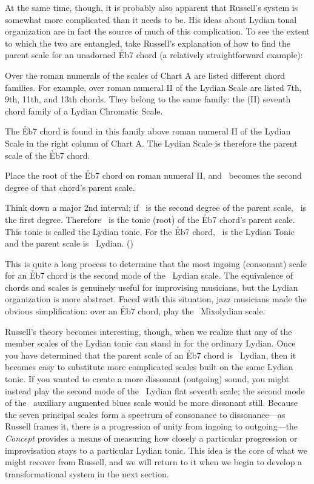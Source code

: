 At the same time, though, it is probably also apparent that Russell's system
is somewhat more complicated than it needs to be. His ideas about Lydian tonal
organization are in fact the source of much of this complication. To see the
extent to which the two are entangled, take Russell's explanation of
how to find the parent scale for an unadorned \h{Eb7} chord (a relatively
straightforward example):
%
\begin{quoting}
  \singlespacing
  Over the roman numerals of the scales of Chart A are listed different chord
  families. For example, over roman numeral II of the Lydian Scale are listed
  7th, 9th, 11th, and 13th chords. They belong to the same family: the (II)
  seventh chord family of a Lydian Chromatic Scale.

  The \h{Eb7} chord is found in this family above roman numeral II of the
  Lydian Scale in the right column of Chart A. The Lydian Scale is therefore
  the parent scale of the \h{Eb7} chord.

  Place the root of the \h{Eb7} chord on roman numeral II, and \Eflat\ becomes
  the second degree of that chord's parent scale.

  Think down a major 2nd interval; if \Eflat\ is the second degree of the
  parent scale, \Dflat\ is the first degree. Therefore \Dflat\ is the tonic
  (root) of the \h{Eb7} chord's parent scale. This tonic is called the Lydian
  tonic. For the \h{Eb7} chord, \Dflat\ is the Lydian Tonic and the parent
  scale is \Dflat\ Lydian. ()
\end{quoting}
%
\noindent This is quite a long process to determine that the most ingoing
(consonant) scale for an \h{Eb7} chord is the second mode of the \Dflat\
Lydian scale. The equivalence of chords and scales is genuinely useful for
improvising musicians, but the Lydian organization is more abstract. Faced
with this situation, jazz musicians made the obvious simplification: over an
\h{Eb7} chord, play the \Eflat\ Mixolydian scale.

Russell's theory becomes interesting, though, when we realize that any of the
member scales of the Lydian tonic can stand in for the ordinary Lydian. Once
you have determined that the parent scale of an \h{Eb7} chord is \Dflat\
Lydian, then it becomes easy to substitute more complicated scales built on
the same Lydian tonic. If you wanted to create a more dissonant (outgoing)
sound, you might instead play the second mode of the \Dflat\ Lydian flat
seventh scale; the second mode of the \Dflat\ auxiliary augmented blues scale
would be more dissonant still. Because the seven principal scales form a
spectrum of consonance to dissonance---as Russell frames it, there is a
progression of unity from ingoing to outgoing---the \emph{Concept} provides a
means of measuring how closely a particular progression or improvisation stays
to a particular Lydian tonic. This idea is the core of what we might recover
from Russell, and we will return to it when we begin to develop a
transformational system in the next section.

